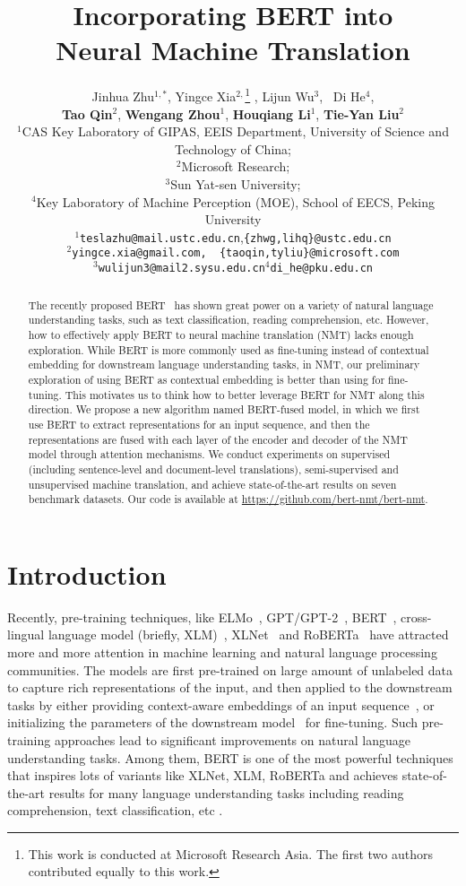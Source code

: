 \documentclass{article} \usepackage{iclr2020_conference,times}
\title{Incorporating BERT into \\Neural Machine Translation}
\author{Jinhua Zhu$^{1,*}$, Yingce Xia$^{2,}$\thanks{This work is conducted at Microsoft Research Asia. The first two authors contributed equally to this work.}\,\,, Lijun Wu$^3$, ~Di He$^4$,\\
\textbf{Tao Qin}$^2$, \textbf{Wengang Zhou}$^1$, \textbf{Houqiang Li}$^1$, \textbf{Tie{-}Yan Liu}$^2$\\
$^1$CAS Key Laboratory of GIPAS, EEIS Department, University of Science and Technology of China;\\ $^2$Microsoft Research; \\
$^3$Sun Yat-sen University;\\
$^4$Key Laboratory of Machine Perception (MOE), School of EECS, Peking University\\
$^1$\texttt{teslazhu@mail.ustc.edu.cn},\;\texttt{\{zhwg,lihq\}@ustc.edu.cn}\\
$^2$\texttt{yingce.xia@gmail.com,\, \{taoqin,tyliu\}@microsoft.com}\\
$^3$\texttt{wulijun3@mail2.sysu.edu.cn}\;\;$^4$\texttt{di\_he@pku.edu.cn}
}
\begin{document}
\maketitle

\begin{abstract}
The recently proposed BERT~\citep{devlin2018bert} has shown great power on a variety of natural language understanding tasks, such as text classification, reading comprehension, etc. However, how to effectively apply BERT to neural machine translation (NMT) lacks enough exploration. While BERT is more commonly used as fine-tuning instead of contextual embedding for downstream language understanding tasks, in NMT, our preliminary exploration of using BERT as contextual embedding is better than using for fine-tuning. This motivates us to think how to better leverage BERT for NMT along this direction. We propose a new algorithm named BERT-fused model, in which we first use BERT to extract representations for an input sequence, and then the representations are fused with each layer of the encoder and decoder of the NMT model through attention mechanisms. We conduct experiments on supervised (including sentence-level and document-level translations), semi-supervised and unsupervised machine translation, and achieve state-of-the-art results on seven benchmark datasets. Our code is available at  \url{https://github.com/bert-nmt/bert-nmt}. 
\end{abstract}

\section{Introduction}
Recently, pre-training techniques, like ELMo~\citep{peters2018deep}, GPT/GPT-2~\citep{radford2018improving,radford2019language}, BERT~\citep{devlin2018bert}, cross-lingual language model (briefly, XLM)~\citep{lample2019cross}, XLNet~\citep{yang2019xlnet} and RoBERTa~\citep{liu2019roberta} have attracted more and more attention in machine learning and natural language processing communities. The models are first pre-trained on large amount of unlabeled data to capture rich representations of the input, and then applied to the downstream tasks by either providing context-aware embeddings of an input sequence~\citep{peters2018deep}, or initializing the parameters of the downstream model~\citep{devlin2018bert} for fine-tuning. Such pre-training approaches lead to significant improvements on natural language understanding tasks. Among them, BERT is one of the most powerful techniques that inspires lots of variants like XLNet, XLM, RoBERTa and achieves state-of-the-art results for many language understanding tasks including reading comprehension, text classification, etc \citep{devlin2018bert}.
\end{document}

